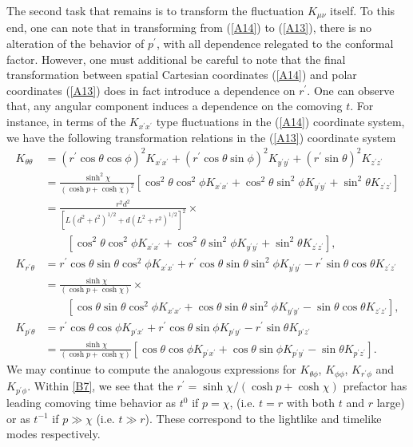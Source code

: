 The second task that remains is to transform the fluctuation $K_{\mu\nu}$ itself. To this end, one can note that in transforming from (\ref{A14}) to (\ref{A13}), there is no alteration of the behavior of $p^{\prime}$, with all dependence relegated to the conformal factor. However, one must additional be careful to note that the final transformation between spatial Cartesian coordinates (\ref{A14})  and polar coordinates (\ref{A13}) does in fact introduce a dependence on $r^{\prime}$. One can observe that, any angular component induces a dependence on the comoving $t$. For instance, in terms of the $K_{x^{\prime}x^{\prime}}$ type fluctuations in the (\ref{A14}) coordinate system, we have the following transformation relations in the (\ref{A13}) coordinate system
%
\begin{align}
K_{\theta\theta}&=(r^{\prime}\cos\theta\cos\phi)^2K_{x^{\prime}x^{\prime}}+(r^{\prime}\cos\theta\sin\phi)^2K_{y^{\prime}y^{\prime}}+(r^{\prime}\sin\theta)^2K_{z^{\prime}z^{\prime}}
\nonumber\\
&=\frac{\sinh^2\chi}{(\cosh p+\cosh \chi)^2}[\cos^2\theta\cos^2\phi K_{x^{\prime}x^{\prime}}+\cos^2\theta\sin^2\phi K_{y^{\prime}y^{\prime}}+\sin^2\theta K_{z^{\prime}z^{\prime}}]
\nonumber\\
&=\frac{r^2d^2}{[L(d^2+t^2)^{1/2}+d(L^2+r^2)^{1/2}]^2}\times
\nonumber\\
&\qquad[\cos^2\theta\cos^2\phi K_{x^{\prime}x^{\prime}}+\cos^2\theta\sin^2\phi K_{y^{\prime}y^{\prime}}+\sin^2\theta K_{z^{\prime}z^{\prime}}],
\nonumber\\
K_{r^{\prime}\theta}&=r^{\prime}\cos\theta\sin\theta\cos^2\phi K_{x^{\prime}x^{\prime}}+r^{\prime}\cos\theta\sin\theta\sin^2\phi K_{y^{\prime}y^{\prime}}-r^{\prime}\sin\theta\cos\theta K_{z^{\prime}z^{\prime}}
\nonumber\\
&=\frac{\sinh\chi}{(\cosh p+\cosh \chi)}\times 
\nonumber\\
&\qquad[\cos\theta\sin\theta\cos^2\phi K_{x^{\prime}x^{\prime}}+\cos\theta\sin\theta\sin^2\phi K_{y^{\prime}y^{\prime}}-\sin\theta\cos\theta K_{z^{\prime}z^{\prime}}],
\nonumber\\
K_{p^{\prime}\theta}&=r^{\prime}\cos\theta\cos\phi K_{p^{\prime}x^{\prime}}+r^{\prime}\cos\theta\sin\phi K_{p^{\prime}y^{\prime}}-r^{\prime}\sin\theta K_{p^{\prime}z^{\prime}}
\nonumber\\
&=\frac{\sinh\chi}{(\cosh p+\cosh \chi)}[\cos\theta\cos\phi K_{p^{\prime}x^{\prime}}+\cos\theta\sin\phi K_{p^{\prime}y^{\prime}}-\sin\theta K_{p^{\prime}z^{\prime}}]. 
\label{B7}
\end{align}
%
We may continue to compute the analogous expressions for $K_{\theta\phi}$, $K_{\phi\phi}$, $K_{r^{\prime}\phi}$ and $K_{p^{\prime}\phi}$. Within \eqref{B7}, we see that the $r^{\prime}=\sinh \chi/(\cosh p +\cosh \chi)$ prefactor has leading comoving time behavior as $t^0$ if $p=\chi$, (i.e. $t=r$ with both $t$ and $r$ large) or as $t^{-1}$ if $p\gg \chi$ (i.e. $t \gg r$). These correspond to the lightlike and timelike modes respectively. 

